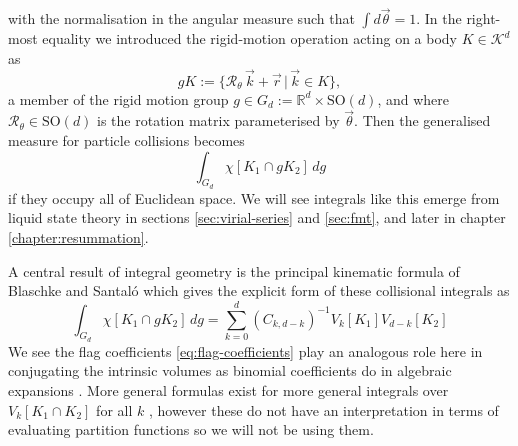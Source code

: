with the normalisation in the angular measure such that $\int d\vec{\theta} = 1$.
In the right-most equality we introduced the rigid-motion operation acting on a body $K \in \mathcal{K}^d$ as
\begin{equation*}
  g K := \{\mathcal{R}_\theta \, \vec{k} + \vec{r} \, | \, \vec{k} \in K\},
\end{equation*}
a member of the rigid motion group $g \in G_d := \mathbb{R}^d \times \mathrm{SO}(d)$, and where $\mathcal{R}_\theta \in \mathrm{SO}(d)$%
is the rotation matrix parameterised by $\vec{\theta}$.
Then the generalised measure for particle collisions becomes
\begin{equation*}
  \int_{G_d} \chi[K_1 \cap g K_2] \, dg
\end{equation*}
if they occupy all of Euclidean space.
We will see integrals like this emerge from liquid state theory in sections \ref{sec:virial-series} and \ref{sec:fmt}, and later in chapter \ref{chapter:resummation}.

\vspace{0.5em}
\begin{tcolorbox}[title=Principal kinematic formula]
  A central result of integral geometry is the principal kinematic formula of Blaschke and Santal\'o \cite{BlaschkeMZ1936,Blaschke1937,SantaloASI1936} which gives the explicit form of these collisional integrals as \cite{Santalo2004,Klain1997}
  \begin{equation}\label{eq:binomial-kinematic-formula}
    \int_{G_d} \chi[K_1 \cap g K_2] \, dg
    =
    \sum_{k=0}^d (C_{k,d-k})^{-1} V_k[K_1] V_{d-k}[K_2]
  \end{equation}
  We see the flag coefficients \eqref{eq:flag-coefficients} play an analogous role here in conjugating the intrinsic volumes as binomial coefficients do in algebraic expansions%
  .
  More general formulas exist for more general integrals over $V_k[K_1 \cap K_2]$ for all $k$ \cite{Klain1997}, however these do not have an interpretation in terms of evaluating partition functions so we will not be using them.
\end{tcolorbox}


